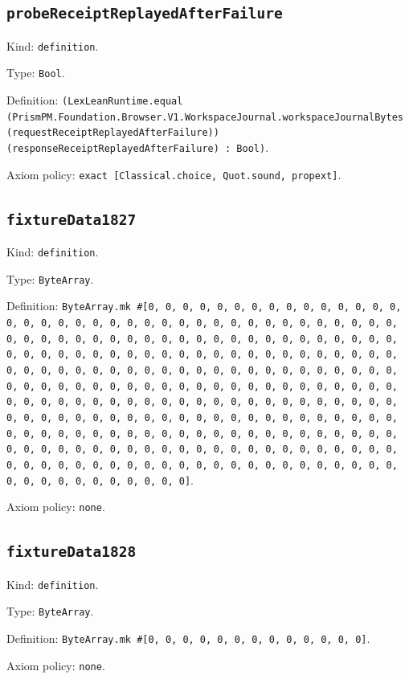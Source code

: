 \documentclass[11pt]{article}
\begin{document}
\subsection*{\texttt{probeReceiptReplayedAfterFailure}}
\noindent Kind: \texttt{definition}.\par
\noindent Type: \texttt{Bool}.\par
\noindent Definition: \texttt{(LexLeanRuntime.equal (PrismPM.Foundation.Browser.V1.WorkspaceJournal.workspaceJournalBytes (requestReceiptReplayedAfterFailure)) (responseReceiptReplayedAfterFailure) : Bool)}.\par
\noindent Axiom policy: \texttt{exact [Classical.choice, Quot.sound, propext]}.\par
\subsection*{\texttt{fixtureData1827}}
\noindent Kind: \texttt{definition}.\par
\noindent Type: \texttt{ByteArray}.\par
\noindent Definition: \texttt{ByteArray.mk \#[0, 0, 0, 0, 0, 0, 0, 0, 0, 0, 0, 0, 0, 0, 0, 0, 0, 0, 0, 0, 0, 0, 0, 0, 0, 0, 0, 0, 0, 0, 0, 0, 0, 0, 0, 0, 0, 0, 0, 0, 0, 0, 0, 0, 0, 0, 0, 0, 0, 0, 0, 0, 0, 0, 0, 0, 0, 0, 0, 0, 0, 0, 0, 0, 0, 0, 0, 0, 0, 0, 0, 0, 0, 0, 0, 0, 0, 0, 0, 0, 0, 0, 0, 0, 0, 0, 0, 0, 0, 0, 0, 0, 0, 0, 0, 0, 0, 0, 0, 0, 0, 0, 0, 0, 0, 0, 0, 0, 0, 0, 0, 0, 0, 0, 0, 0, 0, 0, 0, 0, 0, 0, 0, 0, 0, 0, 0, 0, 0, 0, 0, 0, 0, 0, 0, 0, 0, 0, 0, 0, 0, 0, 0, 0, 0, 0, 0, 0, 0, 0, 0, 0, 0, 0, 0, 0, 0, 0, 0, 0, 0, 0, 0, 0, 0, 0, 0, 0, 0, 0, 0, 0, 0, 0, 0, 0, 0, 0, 0, 0, 0, 0, 0, 0, 0, 0, 0, 0, 0, 0, 0, 0, 0, 0, 0, 0, 0, 0, 0, 0, 0, 0, 0, 0, 0, 0, 0, 0, 0, 0, 0, 0, 0, 0, 0, 0, 0, 0, 0, 0, 0, 0, 0, 0, 0, 0, 0, 0, 0, 0, 0, 0, 0, 0, 0, 0, 0, 0, 0, 0, 0, 0, 0, 0, 0, 0, 0, 0, 0, 0, 0, 0, 0, 0, 0, 0]}.\par
\noindent Axiom policy: \texttt{none}.\par
\subsection*{\texttt{fixtureData1828}}
\noindent Kind: \texttt{definition}.\par
\noindent Type: \texttt{ByteArray}.\par
\noindent Definition: \texttt{ByteArray.mk \#[0, 0, 0, 0, 0, 0, 0, 0, 0, 0, 0, 0, 0]}.\par
\noindent Axiom policy: \texttt{none}.\par
\end{document}

